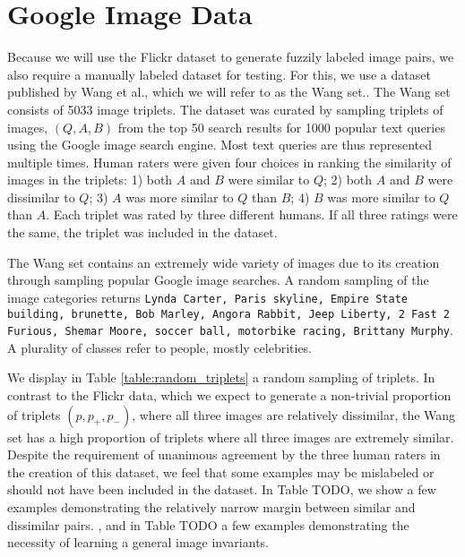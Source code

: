\section{Google Image Data}
Because we will use the Flickr dataset to generate fuzzily labeled image pairs, we also require a manually labeled dataset for testing. For this, we use a dataset published by Wang et al., which we will refer to as the Wang set.\cite{wang2014learning}. 
The Wang set consists of 5033 image triplets. The dataset was curated by sampling triplets of images, $(Q, A, B)$ from the top 50 search results for 1000 popular text queries using the Google image search engine. Most text queries are thus represented multiple times. Human raters were given four choices in ranking the similarity of images in the triplets: 1) both $A$ and $B$ were similar to $Q$; 2) both $A$ and $B$ were dissimilar to $Q$; 3) $A$ was more similar to $Q$ than $B$; 4) $B$ was more similar to $Q$ than $A$. Each triplet was rated by three different humans. If all three ratings were the same, the triplet was included in the dataset.

The Wang set contains an extremely wide variety of images due to its creation through sampling popular Google image searches. A random sampling of the image categories returns \texttt{\justify Lynda Carter, Paris skyline, Empire State building, brunette, Bob Marley, Angora Rabbit, Jeep Liberty, 2 Fast 2 Furious, Shemar Moore, soccer ball, motorbike racing, Brittany Murphy}. A plurality of classes refer to people, mostly celebrities.

We display in Table \ref{table:random_triplets} a random sampling of triplets. In contrast to the Flickr data, which we expect to generate a non-trivial proportion of triplets $(p, p_+, p_-)$, where all three images are relatively dissimilar, the Wang set has a high proportion of triplets where all three images are extremely similar. Despite the requirement of unanimous agreement by the three human raters in the creation of this dataset, we feel that some examples may be mislabeled or should not have been included in the dataset. In Table TODO, we show a few examples demonstrating the relatively narrow margin between similar and dissimilar pairs. , and in Table TODO a few examples demonstrating the necessity of learning a general image invariants.

